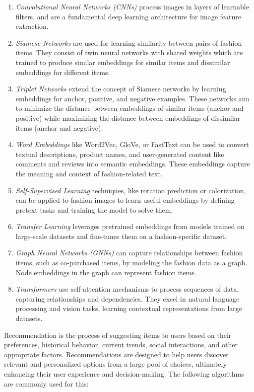 		\begin{enumerate}
			\item \textit{Convolutional Neural Networks (CNNs)} process images in layers of learnable filters, and are a fundamental deep learning architecture for image feature extraction.
			\item \textit{Siamese Networks} are used for learning similarity between pairs of fashion items. They consist of twin neural networks with shared weights which are trained to produce similar embeddings for similar items and dissimilar embeddings for different items.
			\item \textit{Triplet Networks} extend the concept of Siamese networks by learning embeddings for anchor, positive, and negative examples. These networks aim to minimize the distance between embeddings of similar items (anchor and positive) while maximizing the distance between embeddings of dissimilar items (anchor and negative).
			\item \textit{Word Embeddings} like Word2Vec, GloVe, or FastText can be used to convert textual descriptions, product names, and user-generated content like comments and reviews into semantic embeddings. These embeddings capture the meaning and context of fashion-related text.
			\item \textit{Self-Supervised Learning} techniques, like rotation prediction or colorization, can be applied to fashion images to learn useful embeddings by defining pretext tasks and training the model to solve them.
			\item \textit{Transfer Learning} leverages pretrained embeddings from models trained on large-scale datasets and fine-tunes them on a fashion-specific dataset.
			\item \textit{Graph Neural Networks (GNNs)} can capture relationships between fashion items, such as co-purchased items, by modeling the fashion data as a graph. Node embeddings in the graph can represent fashion items.
			\item \textit{Transformers} use self-attention mechanisms to process sequences of data, capturing relationships and dependencies. They excel in natural language processing and vision tasks, learning contextual representations from large datasets.
		\end{enumerate}

		Recommendation is the process of suggesting items to users based on their preferences, historical behavior, current trends, social interactions, and other appropriate factors. Recommendations are designed to help users discover relevant and personalized options from a large pool of choices, ultimately enhancing their user experience and decision-making. The following algorithms are commonly used for this:

